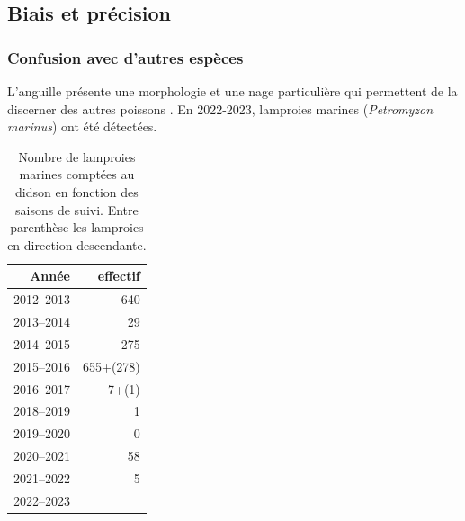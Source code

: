 \documentclass[11pt,twocolumn,titlepage,twoside]{article}
\begin{document}
\subsection{Biais et précision}
\subsubsection{Confusion avec d'autres espèces}
L'anguille présente une morphologie et une nage particulière qui
permettent de la discerner des autres poissons \citep{langkau_can_2012}.
En 2022-2023,  lamproies marines 
(\textit{Petromyzon marinus}) ont été détectées.

\begin{table}
\centering
\caption[Nombre de lamproies]{Nombre de lamproies marines comptées au didson en
fonction des saisons de suivi. Entre parenthèse les lamproies en direction
descendante.}
\label{tab_nblpm}
\begin{tabular}{rr}
  \hline
 Année & effectif  \\ 
  \hline
2012--2013 &  640 \\ 
2013--2014 &  29 \\ 
2014--2015 &  275\\ 
2015--2016 &  655+(278)    \\
2016--2017 & 7+(1)\\
2018--2019 & 1\\
2019--2020 & 0\\
2020--2021 & 58\\
2021--2022 & 5 \\
2022--2023 & \\
   \hline
\end{tabular}
\end{table}



\end{document}

